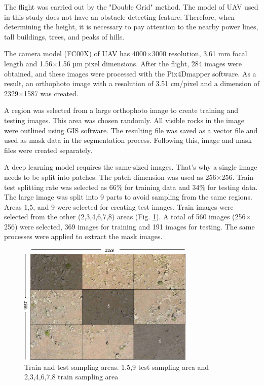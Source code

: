 \documentclass[a4paper,fleqn]{cas-sc}
\begin{document}
The flight was carried out by the "Double Grid" method. The model of UAV used in this study does not have an obstacle detecting feature. Therefore, when determining the height, it is necessary to pay attention to the nearby power lines, tall buildings, trees, and peaks of hills.

The camera model (FC00X) of UAV has 4000$\times$3000 resolution, 3.61 mm focal length and 1.56$\times$1.56 µm pixel dimensions. After the flight, 284 images were obtained, and these images were processed with the Pix4Dmapper software. As a result, an orthophoto image with a resolution of 3.51 cm/pixel and a dimension of 2329$\times$1587 was created.

A region was selected from a large orthophoto image to create training and testing images. This area was chosen randomly. All visible rocks in the image were outlined using GIS software. The resulting file was saved as a vector file and used as mask data in the segmentation process. Following this, image and mask files were created separately.

A deep learning model requires the same-sized images. That's why a single image needs to be split into patches. The patch dimension was used as 256$\times$256. Train-test splitting rate was selected as 66\% for training data and 34\% for testing data. The large image was split into 9 parts to avoid sampling from the same regions. Areas 1,5, and 9 were selected for creating test images. Train images were selected from the other (2,3,4,6,7,8) areas (Fig. \ref{fig:Figure4}). A total of 560 images (256$\times$256) were selected, 369 images for training and 191 images for testing. The same processes were applied to extract the mask images.
\begin{figure}
	\centering
	\includegraphics[width=0.75\textwidth]{fig4.jpg}
	\caption{ Train and test sampling areas. 1,5,9 test sampling area and 2,3,4,6,7,8 train sampling area}
	\label{fig:Figure4}
\end{figure}
\end{document}
